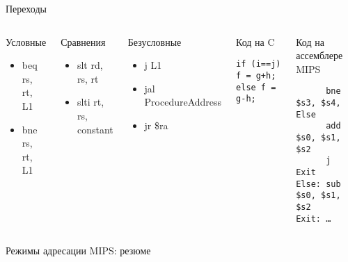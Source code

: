 \begin{frame}[fragile]{Переходы}


\begin{columns}

    \column{5.5cm}
\pause
\begin{block}{\small Условные}
\begin{itemize}\ttfamily\small
    \item beq rs, rt, L1
    \item bne rs, rt, L1
\end{itemize}
\end{block}

\pause\vspace{-.1cm}
\begin{block}{\small Сравнения}
\begin{itemize}\ttfamily\small
    \item slt rd, rs, rt
    \item slti rt, rs, constant
\end{itemize}
\end{block}

\pause\vspace{-.1cm}
\begin{block}{\small Безусловные}
\begin{itemize}\ttfamily\small
    \item j L1
    \item jal ProcedureAddress
    \item jr \$ra
\end{itemize}
\end{block}

    \column{5.5cm}
\pause
\begin{block}{Код на C}
\begin{verbatim}if (i==j) f = g+h;
else f = g-h;\end{verbatim}
\end{block}

\pause
\begin{block}{Код на ассемблере MIPS}
\begin{verbatim}
      bne $s3, $s4, Else
      add $s0, $s1, $s2
      j   Exit
Else: sub $s0, $s1, $s2
Exit: …\end{verbatim}
\end{block}
\end{columns}
\end{frame}

\begin{frame}[plain]{Режимы адресации MIPS: резюме}
\end{frame}


